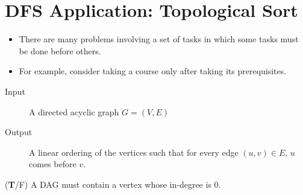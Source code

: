 \documentclass{article}
\begin{document}
\section*{DFS Application: Topological Sort}

\begin{itemize}
    \item There are many problems involving a set of tasks in which some tasks
    must be done before others.
    \item For example, consider taking a course only after taking its prerequisites.
\end{itemize}

\begin{description}
    \item[Input] A directed acyclic graph \(G = (V, E)\)
    \item[Output] A linear ordering of the vertices such that for every edge
    \((u, v) \in E\), \(u\) comes before \(v\).
\end{description}

(\textbf{T}/F) A DAG must contain a vertex whose in-degree is 0.
\end{document}
